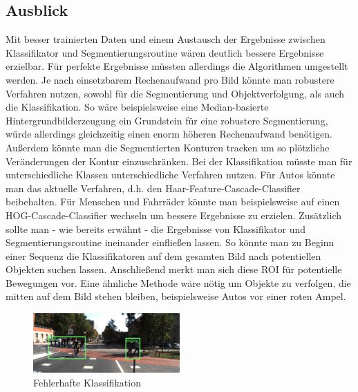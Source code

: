\documentclass[conference]{IEEEtran}
\begin{document}
\subsection{Ausblick}
Mit besser trainierten Daten und einem Austausch der Ergebnisse zwischen Klassifikator und Segmentierungsroutine wären deutlich bessere Ergebnisse erzielbar.
Für perfekte Ergebnisse müssten allerdings die Algorithmen umgestellt werden. Je nach einsetzbarem Rechenaufwand pro Bild könnte man robustere Verfahren nutzen, sowohl für die Segmentierung und Objektverfolgung, als auch die Klassifikation. So wäre beispielsweise eine Median-basierte Hintergrundbilderzeugung ein Grundstein für eine robustere Segmentierung, würde allerdings gleichzeitig einen enorm höheren Rechenaufwand benötigen.
Außerdem könnte man die Segmentierten Konturen tracken um so plötzliche Veränderungen der Kontur einzuschränken.
Bei der Klassifikation müsste man für unterschiedliche Klassen unterschiedliche Verfahren nutzen. Für Autos könnte man das aktuelle Verfahren, d.h. den Haar-Feature-Cascade-Classifier beibehalten. Für Menschen und Fahrräder könnte man beispielsweise auf einen HOG-Cascade-Classifier wechseln um bessere Ergebnisse zu erzielen.
Zusätzlich sollte man - wie bereits erwähnt - die Ergebnisse von Klassifikator und Segmentierungsroutine ineinander einfließen lassen. So könnte man zu Beginn einer Sequenz die Klassifikatoren auf dem gesamten Bild nach potentiellen Objekten suchen lassen. Anschließend merkt man sich diese ROI für potentielle Bewegungen vor. Eine ähnliche Methode wäre nötig um Objekte zu verfolgen, die mitten auf dem Bild stehen bleiben, beispielsweise Autos vor einer roten Ampel.


\begin{figure}
\includegraphics[width=0.5\textwidth]{ds06_failed}
\caption{Fehlerhafte Klassifikation}
\end{figure}




\end{document}
